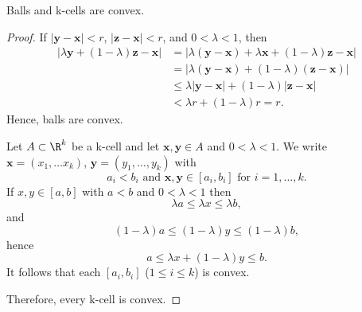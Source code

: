 \begin{example}
Balls and k-cells are convex.
\end{example}
\begin{proof}
If $|\mathbf{y}-\mathbf{x}|<r$, $|\mathbf{z}-\mathbf{x}|<r$, and $0<\lambda<1$, then
\begin{align*}
    |\lambda\mathbf{y}+(1-\lambda)\mathbf{z}-\mathbf{x}| &= |\lambda(\mathbf{y}-\mathbf{x})+\lambda\mathbf{x}+(1-\lambda)\mathbf{z}-\mathbf{x}| \\
    &= |\lambda(\mathbf{y}-\mathbf{x})+(1-\lambda)(\mathbf{z}-\mathbf{x})| \\
    &\leq \lambda|\mathbf{y}-\mathbf{x}|+(1-\lambda)|\mathbf{z}-\mathbf{x}| \\
    &< \lambda r + (1-\lambda)r = r.
\end{align*}
Hence, balls are convex.

Let $A \subset \R^k$ be a k-cell and let $\mathbf{x},\mathbf{y} \in A$ and $0<\lambda<1$. 
We write $\mathbf{x}=(x_1, \ldots x_k)$, $\mathbf{y}=(y_1, \ldots, y_k)$ with
\[
a_i<b_i \text{ and } \mathbf{x}, \mathbf{y} \in [a_i,b_i] \text{ for } i=1, \ldots, k.
\]
If $x, y \in [a,b]$ with $a<b$ and $0<\lambda<1$ then
\[
{\lambda}a \leq {\lambda}x \leq {\lambda}b,
\]
and
\[
(1-\lambda)a \leq (1-\lambda)y \leq (1-\lambda)b,
\]
hence 
\[
a \leq {\lambda}x+(1-\lambda)y \leq b.
\]
It follows that each $[a_i, b_i]$ ($1 \leq i \leq k$) is convex.

Therefore, every k-cell is convex.
\end{proof}
